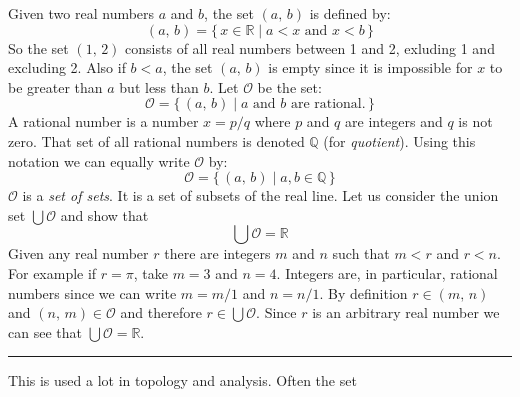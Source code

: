             \begin{example}
                Given two real numbers $a$ and $b$, the set $(a,\,b)$ is defined
                by:
                \begin{equation}
                    (a,\,b)=\{\,x\in\mathbb{R}\;|\;a<x\textrm{ and }x<b\,\}
                \end{equation}
                So the set $(1,\,2)$ consists of all real numbers between 1 and
                2, exluding 1 and excluding 2. Also if $b<a$, the set
                $(a,\,b)$ is empty since it is impossible for
                $x$ to be greater than $a$ but less than $b$.
                Let $\mathcal{O}$ be the set:
                \begin{equation}
                    \mathcal{O}=\{\,(a,\,b)\;|\;
                        a\textrm{ and }b\textrm{ are rational.}\,\}
                \end{equation}
                A rational number is a number $x=p/q$ where $p$ and $q$ are
                integers and $q$ is not zero. That set of all rational numbers
                is denoted $\mathbb{Q}$ (for \textit{quotient}). Using this
                notation we can equally write $\mathcal{O}$ by:
                \begin{equation}
                    \mathcal{O}=\{\,(a,\,b)\;|\;a,b\in\mathbb{Q}\,\}
                \end{equation}
                $\mathcal{O}$ is a \textit{set of sets}. It is a set of subsets
                of the real line. Let us consider the union set
                $\bigcup\mathcal{O}$ and show that
                \begin{equation}
                    \bigcup\mathcal{O}=\mathbb{R}
                \end{equation}
                Given any real number $r$ there are integers $m$ and $n$
                such that $m<r$ and $r<n$. For example if $r=\pi$, take
                $m=3$ and $n=4$. Integers are, in particular, rational numbers
                since we can write $m=m/1$ and $n=n/1$. By definition
                $r\in(m,\,n)$ and $(n,\,m)\in\mathcal{O}$ and therefore
                $r\in\bigcup\mathcal{O}$. Since $r$ is an arbitrary real number
                we can see that $\bigcup\mathcal{O}=\mathbb{R}$.
            \end{example}
            \hrule\par\hfill\par
            This is used a lot in topology and analysis. Often the set
